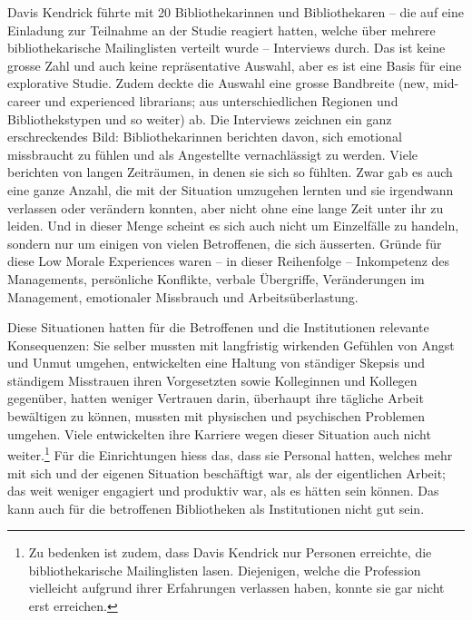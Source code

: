 \documentclass[a4paper,
fontsize=11pt,
oneside,
numbers=noperiodatend,
parskip=half-,
bibliography=totoc,
final
]{scrartcl}
\begin{document}
Davis Kendrick führte mit 20 Bibliothekarinnen und Bibliothekaren -- die
auf eine Einladung zur Teilnahme an der Studie reagiert hatten, welche
über mehrere bibliothekarische Mailinglisten verteilt wurde --
Interviews durch. Das ist keine grosse Zahl und auch keine
repräsentative Auswahl, aber es ist eine Basis für eine explorative
Studie. Zudem deckte die Auswahl eine grosse Bandbreite (new, mid-career
und experienced librarians; aus unterschiedlichen Regionen und
Bibliothekstypen und so weiter) ab. Die Interviews zeichnen ein ganz
erschreckendes Bild: Bibliothekarinnen berichten davon, sich emotional
missbraucht zu fühlen und als Angestellte vernachlässigt zu werden.
Viele berichten von langen Zeiträumen, in denen sie sich so fühlten.
Zwar gab es auch eine ganze Anzahl, die mit der Situation umzugehen
lernten und sie irgendwann verlassen oder verändern konnten, aber nicht
ohne eine lange Zeit unter ihr zu leiden. Und in dieser Menge scheint es
sich auch nicht um Einzelfälle zu handeln, sondern nur um einigen von
vielen Betroffenen, die sich äusserten. Gründe für diese Low Morale
Experiences waren -- in dieser Reihenfolge -- Inkompetenz des
Managements, persönliche Konflikte, verbale Übergriffe, Veränderungen im
Management, emotionaler Missbrauch und Arbeitsüberlastung.

Diese Situationen hatten für die Betroffenen und die Institutionen
relevante Konsequenzen: Sie selber mussten mit langfristig wirkenden
Gefühlen von Angst und Unmut umgehen, entwickelten eine Haltung von
ständiger Skepsis und ständigem Misstrauen ihren Vorgesetzten sowie
Kolleginnen und Kollegen gegenüber, hatten weniger Vertrauen darin,
überhaupt ihre tägliche Arbeit bewältigen zu können, mussten mit
physischen und psychischen Problemen umgehen. Viele entwickelten ihre
Karriere wegen dieser Situation auch nicht weiter.\footnote{Zu bedenken
  ist zudem, dass Davis Kendrick nur Personen erreichte, die
  bibliothekarische Mailinglisten lasen. Diejenigen, welche die
  Profession vielleicht aufgrund ihrer Erfahrungen verlassen haben,
  konnte sie gar nicht erst erreichen.} Für die Einrichtungen hiess das,
dass sie Personal hatten, welches mehr mit sich und der eigenen
Situation beschäftigt war, als der eigentlichen Arbeit; das weit weniger
engagiert und produktiv war, als es hätten sein können. Das kann auch
für die betroffenen Bibliotheken als Institutionen nicht gut sein.
\end{document}
